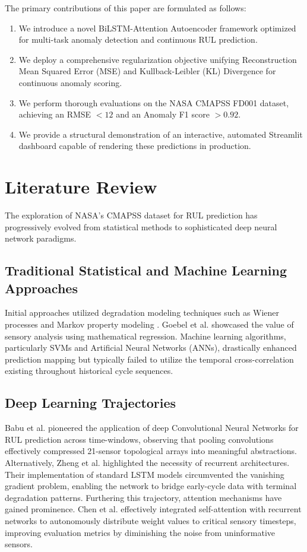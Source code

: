 \documentclass[conference]{IEEEtran}
\begin{document}
The primary contributions of this paper are formulated as follows:
\begin{enumerate}
    \item We introduce a novel BiLSTM-Attention Autoencoder framework optimized for multi-task anomaly detection and continuous RUL prediction.
    \item We deploy a comprehensive regularization objective unifying Reconstruction Mean Squared Error (MSE) and Kullback-Leibler (KL) Divergence for continuous anomaly scoring.
    \item We perform thorough evaluations on the NASA CMAPSS FD001 dataset, achieving an RMSE $<12$ and an Anomaly F1 score $>0.92$.
    \item We provide a structural demonstration of an interactive, automated Streamlit dashboard capable of rendering these predictions in production.
\end{enumerate}

\section{Literature Review}
The exploration of NASA's CMAPSS dataset for RUL prediction has progressively evolved from statistical methods to sophisticated deep neural network paradigms.

\subsection{Traditional Statistical and Machine Learning Approaches}
Initial approaches utilized degradation modeling techniques such as Wiener processes \cite{wiener1} and Markov property modeling \cite{markov1}. Goebel et al. \cite{intro2} showcased the value of sensory analysis using mathematical regression. Machine learning algorithms, particularly SVMs \cite{svm_rul} and Artificial Neural Networks (ANNs), drastically enhanced prediction mapping but typically failed to utilize the temporal cross-correlation existing throughout historical cycle sequences.

\subsection{Deep Learning Trajectories}
Babu et al. \cite{cnn_rul} pioneered the application of deep Convolutional Neural Networks for RUL prediction across time-windows, observing that pooling convolutions effectively compressed 21-sensor topological arrays into meaningful abstractions. Alternatively, Zheng et al. \cite{lstm_rul} highlighted the necessity of recurrent architectures. Their implementation of standard LSTM models circumvented the vanishing gradient problem, enabling the network to bridge early-cycle data with terminal degradation patterns. 
Furthering this trajectory, attention mechanisms have gained prominence. Chen et al. \cite{attention_rul} effectively integrated self-attention with recurrent networks to autonomously distribute weight values to critical sensory timesteps, improving evaluation metrics by diminishing the noise from uninformative sensors.
\end{document}
